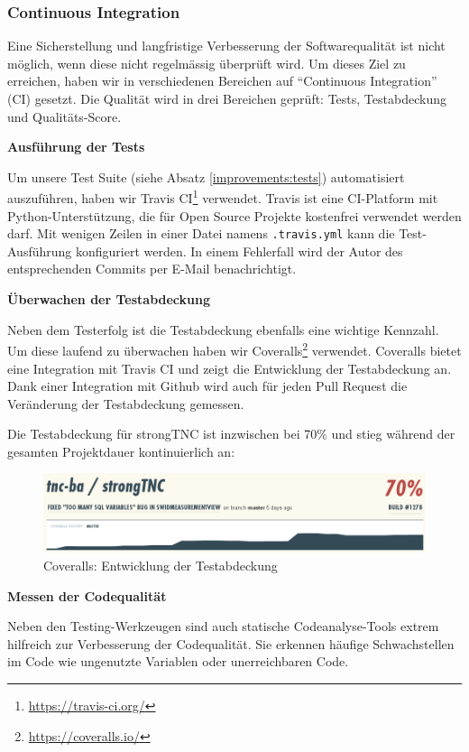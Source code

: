 \subsubsection{Continuous Integration}

Eine Sicherstellung und langfristige Verbesserung der Softwarequalität ist nicht
möglich, wenn diese nicht regelmässig überprüft wird. Um dieses Ziel zu
erreichen, haben wir in verschiedenen Bereichen auf \enquote{Continuous
Integration} (CI) gesetzt. Die Qualität wird in drei Bereichen geprüft: Tests,
Testabdeckung und Qualitäts-Score.

\textbf{Ausführung der Tests}

Um unsere Test Suite (siehe Absatz \ref{improvements:tests}) automatisiert
auszuführen, haben wir Travis
CI\footnote{\url{https://travis-ci.org/}} verwendet. Travis ist
eine CI-Platform mit Python-Unterstützung, die für Open Source Projekte
kostenfrei verwendet werden darf. Mit wenigen Zeilen in einer Datei namens
\texttt{.travis.yml} kann die Test-Ausführung konfiguriert werden. In einem
Fehlerfall wird der Autor des entsprechenden Commits per E-Mail benachrichtigt.

\textbf{Überwachen der Testabdeckung}

Neben dem Testerfolg ist die Testabdeckung ebenfalls eine wichtige Kennzahl. Um
diese laufend zu überwachen haben wir
Coveralls\footnote{\url{https://coveralls.io/}} verwendet. Coveralls bietet eine
Integration mit Travis CI und zeigt die Entwicklung der Testabdeckung an. Dank
einer Integration mit Github wird auch für jeden Pull Request die Veränderung
der Testabdeckung gemessen.

Die Testabdeckung für strongTNC ist inzwischen bei 70\% und stieg während der
gesamten Projektdauer kontinuierlich an:

\begin{figure}[H]
	\centering
	\includegraphics[width=\textwidth]{images/coveralls}
	\caption{Coveralls: Entwicklung der Testabdeckung}
	\label{improvements:coveralls}
\end{figure}

\textbf{Messen der Codequalität}

Neben den Testing-Werkzeugen sind auch statische Codeanalyse-Tools extrem
hilfreich zur Verbesserung der Codequalität. Sie erkennen häufige Schwachstellen
im Code wie ungenutzte Variablen oder unerreichbaren Code.


